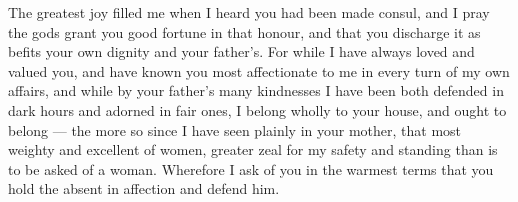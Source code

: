 

 The greatest joy filled me when I heard you had been made consul, and I pray the gods grant you good fortune in that honour, and that you discharge it as befits your own dignity and your father's. For while I have always loved and valued you, and have known you most affectionate to me in every turn of my own affairs, and while by your father's many kindnesses I have been both defended in dark hours and adorned in fair ones, I belong wholly to your house, and ought to belong --- the more so since I have seen plainly in your mother, that most weighty and excellent of women, greater zeal for my safety and standing than is to be asked of a woman. Wherefore I ask of you in the warmest terms that you hold the absent in affection and defend him.
